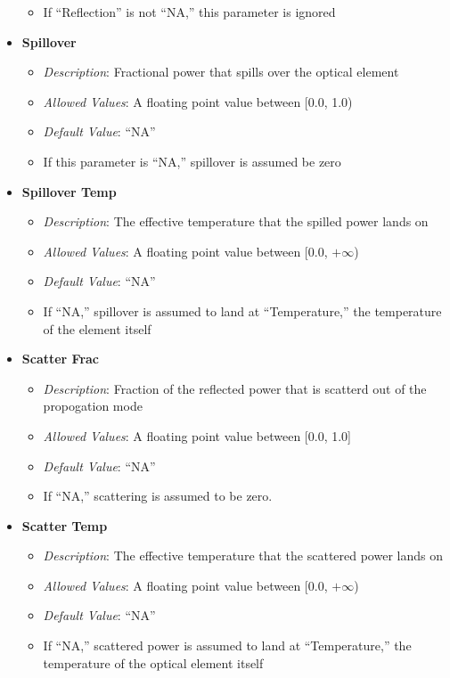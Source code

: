 \documentclass[11pt]{article} %
\begin{document}
\begin{itemize}[noitemsep,topsep=0pt]
\begin{itemize}[noitemsep,topsep=0pt]
\begin{itemize}[noitemsep,topsep=0pt]
			\end{itemize}
		\item If ``Reflection'' is not ``NA,'' this parameter is ignored
		\end{itemize}
	\item \textbf{Spillover}
		\begin{itemize}[noitemsep,topsep=0pt]
		\item \textit{Description}: Fractional power that spills over the optical element
		\item \textit{Allowed Values}: A floating point value between [0.0, 1.0)
		\item \textit{Default Value}: ``NA''
		\item If this parameter is ``NA,'' spillover is assumed be zero
		\end{itemize}
	\item \textbf{Spillover Temp}
		\begin{itemize}[noitemsep,topsep=0pt]
		\item \textit{Description}: The effective temperature that the spilled power lands on 
		\item \textit{Allowed Values}: A floating point value between [0.0, $+\infty$)
		\item \textit{Default Value}: ``NA''
		\item If ``NA,'' spillover is assumed to land at ``Temperature,'' the temperature of the element itself
		\end{itemize}
	\item \textbf{Scatter Frac}
		\begin{itemize}[noitemsep,topsep=0pt]
		\item \textit{Description}: Fraction of the reflected power that is scatterd out of the propogation mode
		\item \textit{Allowed Values}: A floating point value between [0.0, 1.0]
		\item \textit{Default Value}: ``NA''
		\item If ``NA,'' scattering is assumed to be zero.
		\end{itemize}
	\item \textbf{Scatter Temp}
		\begin{itemize}[noitemsep,topsep=0pt]
		\item \textit{Description}: The effective temperature that the scattered power lands on 
		\item \textit{Allowed Values}: A floating point value between [0.0, $+\infty$)
		\item \textit{Default Value}: ``NA''
		\item If ``NA,'' scattered power is assumed to land at ``Temperature,'' the temperature of the optical element itself
		\end{itemize}
\end{itemize}
\end{document}

